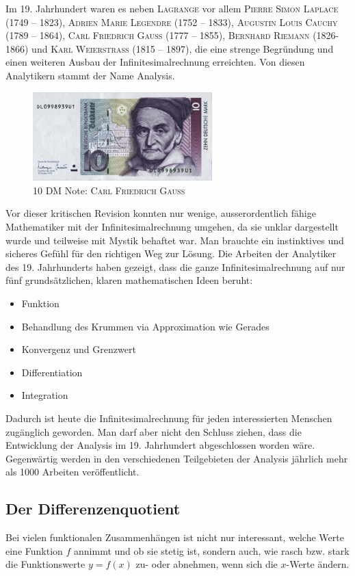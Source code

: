 \documentclass[%
11pt,%
twoside,%
titlepage,%
german,%
headsepline%
]{scrartcl}
\begin{document}
Im 19. Jahrhundert waren es neben \textsc{Lagrange} vor allem \textsc{Pierre Simon Laplace} (1749 -- 1823), \textsc{Adrien Marie Legendre} (1752 -- 1833), \textsc{Augustin Louis Cauchy} (1789 -- 1864), \textsc{Carl Friedrich Gauss} (1777 -- 1855), \textsc{Bernhard Riemann} (1826-1866) und \textsc{Karl Weierstrass} (1815 -- 1897), die eine strenge Begr\"undung und einen weiteren Ausbau der Infinitesimalrechnung erreichten. Von diesen Analytikern stammt der Name \glqq Analysis\grqq.
\begin{figure}
\begin{center}
\includegraphics[width=0.618\textwidth]{pictures/gauss}
\caption{10 DM Note: \textsc{Carl Friedrich Gauss}}
\end{center}
\end{figure}
Vor dieser kritischen Revision konnten nur wenige, ausserordentlich f\"ahige Mathematiker mit der Infinitesimalrechnung umgehen, da sie unklar dargestellt wurde und teilweise mit Mystik behaftet war. Man brauchte ein instinktives und sicheres Gef\"uhl f\"ur den richtigen Weg zur L\"osung.
Die Arbeiten der Analytiker des 19. Jahrhunderts haben gezeigt, dass die ganze Infinitesimalrechnung auf nur f\"unf grunds\"atzlichen, klaren mathematischen Ideen beruht:
\begin{itemize}
\item Funktion
\item Behandlung des Krummen via Approximation wie Gerades
\item Konvergenz und Grenzwert
\item Differentiation
\item Integration
\end{itemize}
Dadurch ist heute die Infinitesimalrechnung f\"ur jeden interessierten Menschen zug\"anglich geworden.
Man darf aber nicht den Schluss ziehen, dass die Entwicklung der Analysis im 19. Jahrhundert abgeschlossen worden w\"are. Gegenw\"artig werden in den verschiedenen Teilgebieten der Analysis j\"ahrlich mehr als 1000 Arbeiten ver\"offentlicht.

\subsection{Der Differenzenquotient}
Bei vielen funktionalen Zusammenh\"angen ist nicht nur interessant, welche Werte eine Funktion $f$ annimmt und ob sie stetig ist, sondern auch, wie rasch bzw. stark die Funktionswerte $y=f(x)$ zu- oder abnehmen, wenn sich die $x$-Werte \"andern.
\end{document}
